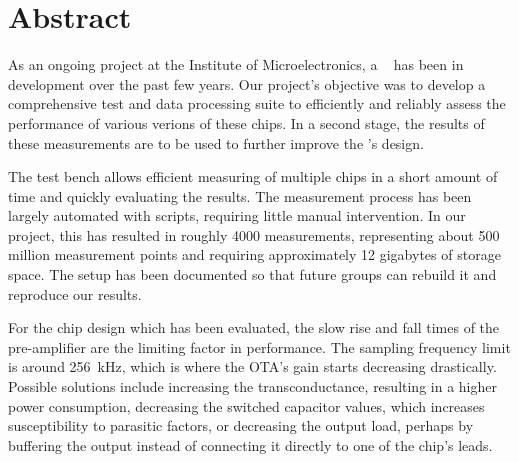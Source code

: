 \chapter*{Abstract}
\label{ch:abstract}

As an ongoing  project at the Institute of Microelectronics,  a \sdm~ has been
in development over the past few years. Our project's objective was to develop
a comprehensive  test and  data processing suite  to efficiently  and reliably
assess the performance  of various verions of these chips. In  a second stage,
the results of these measurements are to be used to further improve the \sdm's
design.

The test bench allows efficient measuring  of multiple chips in a short amount
of time and quickly evaluating the  results.  The measurement process has been
largely automated with scripts, requiring  little manual intervention.  In our
project, this  has resulted  in roughly \num{4000}  measurements, representing
about  \num{500}  million  measurement   points  and  requiring  approximately
\num{12} gigabytes  of storage space.  The  setup has been documented  so that
future groups can rebuild it and reproduce our results.

For the chip design which has been  evaluated, the slow rise and fall times of
the  pre-amplifier  are  the  limiting  factor  in  performance. The  sampling
frequency  limit is  around \SI{256}{\kilo\hertz},  which is  where the  OTA's
gain  starts decreasing  drastically.  Possible  solutions include  increasing
the  transconductance, resulting  in  a higher  power consumption,  decreasing
the  switched capacitor  values, which  increases susceptibility  to parasitic
factors,  or decreasing  the  output  load, perhaps  by  buffering the  output
instead of connecting it directly to one of the chip's leads.
